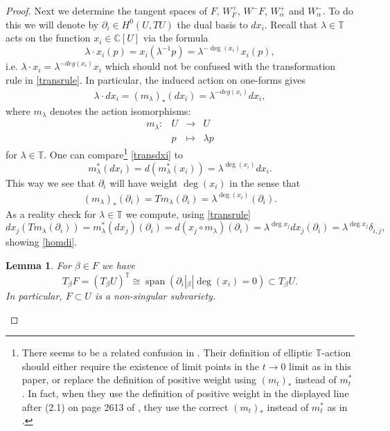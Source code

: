 \documentclass[12pt]{article}
\numberwithin{equation}{section}
\newtheorem{lemma}[theorem]{Lemma}
\theoremstyle{remark}
\theoremstyle{definition}
\numberwithin{theorem}{section}
\def\beq{\begin{eqnarray}}
\def\eeq{\end{eqnarray}}
\def\C{\mathbb{C}}
\newcommand{\T}{{\mathbb{T}}}
\renewcommand{\1}{\mathbbm{1}}
\begin{document}
\begin{proof}
	Next we determine the tangent spaces of $F$, $W^+_{F}$, $W^-{F}$, $W^+_\alpha$ and $W^-_\alpha$. To do this we will denote by $\partial_i\in H^0(U,TU)$ the dual basis to $dx_i$. Recall that  $\lambda\in \T$ acts on the function $x_i\in\C[U]$ via the formula $$\lambda\cdot x_i(p)=x_i( \lambda^{-1}p)=\lambda^{-\deg(x_i)}x_i(p),$$ i.e. $\lambda\cdot x_i=\lambda^{-deg(x_i)}x_i$ which should not be confused with the transformation rule in \eqref{transrule}.  In particular, the induced action on one-forms gives \beq\label{transdxi} \lambda\cdot d x_i =(m_\lambda)_*(d x_i)=\lambda^{-deg(x_i)}dx_i, \eeq where $m_\lambda$ denotes the action isomorphisms:  $$\begin{array}{cccc}m_\lambda: &U&\to& U\\ &p&\mapsto& \lambda p\end{array}$$ for $\lambda\in \T$. One can compare\footnote{There seems to be a related confusion in \cite[Definition 1.1]{bellamy-etal}. Their  definition of elliptic $\T$-action  should either require the existence of limit points in the $t\to 0$ limit as in this paper, or replace the definition of positive weight using $(m_t)_*$ instead of $m_t^*$. In fact, when they use the definition of positive weight in the displayed line after (2.1) on page 2613 of \cite{bellamy-etal}, they use the correct $(m_t)_*$ instead of $m_t^*$ as in   \cite[Definition 1.1]{bellamy-etal}. } \eqref{transdxi} to $$m_\lambda^*(dx_i)=d(m_\lambda^*(x_i))=\lambda^{\deg(x_i)}dx_i .$$  This way we see that $\partial_i$ will have weight $\deg(x_i)$ in the sense that \beq\label{homdi} (m_\lambda)_*(\partial_i)=T m_\lambda(\partial_i)=\lambda^{\deg(x_i)}(\partial_i).\eeq  As a reality check for $\lambda\in \T$  we compute, using \eqref{transrule} $$dx_j(T m_\lambda (\partial_i))=m_\lambda^*(dx_j)(\partial_i)=d ( x_j\circ m_\lambda)(\partial_i)=  \lambda^{\deg x_j} dx_j(\partial_i)=\lambda^{\deg x_j} \delta_{i,j},$$ showing \eqref{homdi}.
	\begin{lemma} For $\beta\in F$ we have $$T_\beta F = (T_\beta U)^\T\cong \operatorname{span}(\partial_i|_\beta|\deg(x_i)=0)\subset T_\beta U.$$ In particular, $F\subset U$ is a non-singular subvariety. 
	\end{lemma}

\end{proof}
\end{document}
